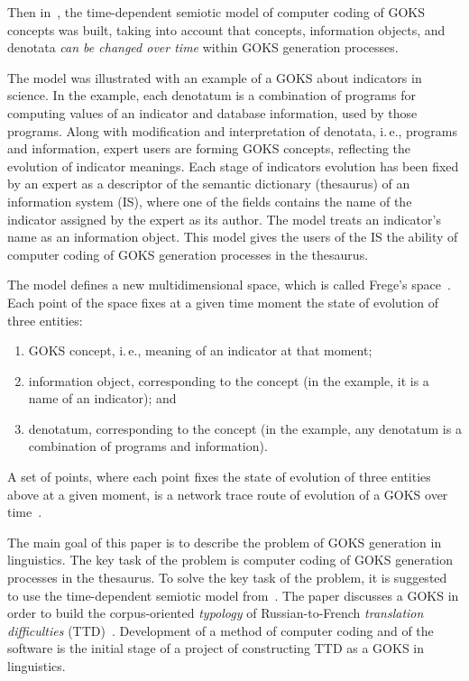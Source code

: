 \begin{multicols}{2}
Then in~\cite{1bun}, the time-dependent semiotic \mbox{model} of computer coding of GOKS 
concepts was built, \mbox{taking} into account that concepts, information objects, and \mbox{denotata}
\textit{can be changed over time} within GOKS \mbox{generation} processes. 

The model was illustrated 
with an example of a GOKS about indicators in science. In the \mbox{example}, each denotatum is a 
combination of programs for \mbox{computing} values of an indicator and database \mbox{information}, used by 
those programs. Along with modification and \mbox{interpretation} of denotata, i.\,e., 
programs and \mbox{information},  expert users are forming GOKS concepts, reflecting the evolution of indicator 
meanings. Each stage of indicators evolution has been fixed by an expert as a descriptor of the 
semantic dictionary (\mbox{thesaurus}) of an information system (IS), where one of the fields contains 
the name of the indicator assigned by the expert as its author. The model treats an indicator's 
name as an information object. This model gives the users of the IS the ability of computer 
coding of GOKS generation processes in the \mbox{thesaurus}.
   
   The model defines a new multidimensional space, which is called Frege's space~\cite{1bun}. 
Each point of the space fixes at a given time moment the state of evolution of three entities:
   \begin{enumerate}[(1)]
   \item
GOKS concept, i.\,e., meaning of an indicator at that moment;
\item information object, corresponding to the concept (in the example, it is a name of 
an indicator); and
\item denotatum, corresponding to the concept (in the example, any denotatum is a combination of \mbox{programs} and 
information).
\end{enumerate}

   A set of points, where each point fixes the state of evolution of three entities above at a given 
moment, is a network trace route of evolution of a GOKS over time~\cite{1bun}.
   
   The main goal of this paper is to describe the problem of GOKS generation in linguistics. 
The key task of the problem is computer coding of GOKS generation processes in the \mbox{thesaurus}. 
To solve the key task of the problem, it is suggested to use the time-dependent semiotic model 
from~\cite{1bun}. The paper discusses a GOKS in order to build the corpus-oriented 
\textit{typology} of Russian-to-French \textit{translation difficulties} (TTD)~\cite{8bun}. 
Development of a method of computer coding and of the software is the initial stage of a project 
of constructing TTD as a GOKS in linguistics.
   

\end{multicols}
